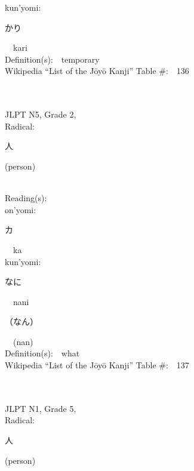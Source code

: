 \begin{multicols}{2}
{\hspace*{1em}}kun'yomi:\ \ \\
{\hspace*{2em}}{\begin{CJK}{UTF8}{min} かり \end{CJK}}\ \ kari\ \ \\
Definition(s):\ \ temporary \\
Wikipedia ``List of the J\=oy\=o Kanji'' Table \#:\ \ 136 \\
\ \ \\
{\fontsize{34pt}{40pt}  }\ \ \\  %
{JLPT N5, Grade 2, \\Radical:\ \ {\begin{CJK}{UTF8}{min} 人 \end{CJK}} (person) } \\
Reading(s):\ \ \\
{\hspace*{1em}}on'yomi:\ \ \\
{\hspace*{2em}}{\begin{CJK}{UTF8}{min} カ \end{CJK}}\ \ ka\ \ \\
{\hspace*{1em}}kun'yomi:\ \ \\
{\hspace*{2em}}{\begin{CJK}{UTF8}{min} なに \end{CJK}}\ \ nani\ \ \\
{\hspace*{2em}}{\begin{CJK}{UTF8}{min} （なん） \end{CJK}}\ \ (nan)\ \ \\
Definition(s):\ \ what \\
Wikipedia ``List of the J\=oy\=o Kanji'' Table \#:\ \ 137 \\
\ \ \\
{\fontsize{34pt}{40pt}  }\ \ \\  %
{JLPT N1, Grade 5, \\Radical:\ \ {\begin{CJK}{UTF8}{min} 人 \end{CJK}} (person) } \\

\end{multicols}
